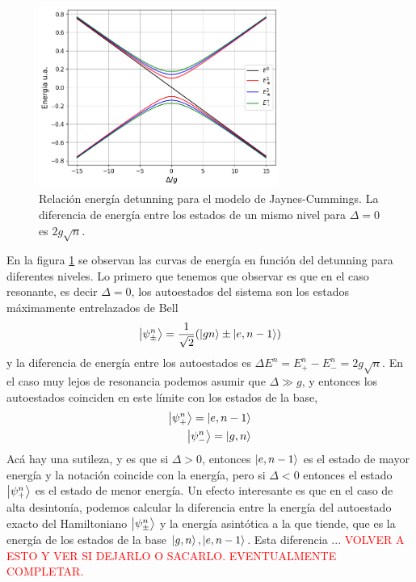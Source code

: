 \begin{figure}
    \centering
    \includegraphics[width=0.7\textwidth]{figuras/ch3/relacion energia detunning jcm simple.png}
    \caption{Relaci\'on energ\'ia detunning para el modelo de Jaynes-Cummings. La diferencia de energ\'ia entre los estados de un mismo nivel para $\Delta=0$ es $2g\sqrt{n}$.}
    \label{fig:relación energia detunning jcm1}
\end{figure}
En la figura \ref{fig:relación energia detunning jcm1} se observan las curvas de energ\'ia en funci\'on del detunning para diferentes niveles. Lo primero que tenemos que observar es que en el caso resonante, es decir $\Delta=0$, los autoestados del sistema son los estados máximamente entrelazados de Bell
\begin{equation}
    \ket{\psi_\pm^n}=\frac{1}{\sqrt{2}}(\ket{gn}\pm\ket{e,n-1})
\end{equation} 
y la diferencia de energ\'ia entre los autoestados es $\Delta E^n =E^n_+-E^n_-=2g\sqrt{n}$. En el caso muy lejos de resonancia podemos asumir que $\Delta \gg g $, y entonces los autoestados coinciden en este l\'imite con los estados de la base, 
\begin{equation}
    \begin{aligned}
        \ket{\psi^n_+}=\ket{e,n-1} \\
        \ket{\psi^n_-}=\ket{g,n}
    \end{aligned}
\end{equation}
Ac\'a hay una sutileza, y es que si $\Delta>0$, entonces $\ket{e,n-1}$ es el estado de mayor energ\'ia y la notaci\'on coincide con la energ\'ia, pero si $\Delta<0$ entonces el estado $\ket{\psi^n_+}$ es el estado de menor energ\'ia. 
Un efecto interesante es que en el caso de alta desinton\'ia, podemos calcular la diferencia entre la energía del autoestado exacto del Hamiltoniano $\ket{\psi_\pm^n}$ y la energía asintótica a la que tiende, que es la energía de los estados de la base $\ket{g,n},\ket{e,n-1}$. Esta diferencia ... \textcolor{red}{VOLVER A ESTO Y VER SI DEJARLO O SACARLO. EVENTUALMENTE COMPLETAR.}
